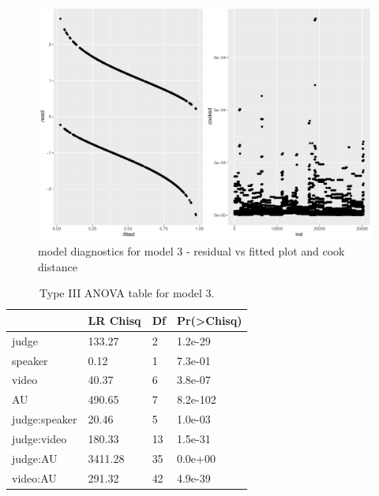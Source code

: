 \documentclass{monashthesis}
\begin{document}
\begin{figure}

{\centering \includegraphics[width=1\linewidth]{figures/mod3-diag-1-1} 

}

\caption{model diagnostics for model 3 - residual vs fitted plot and cook distance}\label{fig:mod3-diag-1}
\end{figure}

\begin{table}

\caption{\label{tab:anova-3}\label{tab:anova-3}Type III ANOVA table for model 3. }
\centering
\begin{tabular}[t]{l|l|l|l}
\hline
  & LR Chisq & Df & Pr(>Chisq)\\
\hline
judge & 133.27 & 2 & 1.2e-29\\
\hline
speaker & 0.12 & 1 & 7.3e-01\\
\hline
video & 40.37 & 6 & 3.8e-07\\
\hline
AU & 490.65 & 7 & 8.2e-102\\
\hline
judge:speaker & 20.46 & 5 & 1.0e-03\\
\hline
judge:video & 180.33 & 13 & 1.5e-31\\
\hline
judge:AU & 3411.28 & 35 & 0.0e+00\\
\hline
video:AU & 291.32 & 42 & 4.9e-39\\
\hline
\end{tabular}
\end{table}
\end{document}
